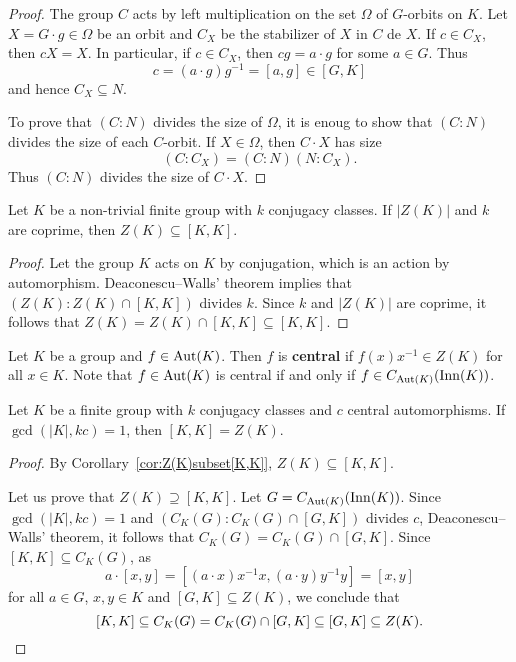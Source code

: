 \begin{proof}
  The group $C$ acts by left multiplication on the set $\Omega$ of
  $G$-orbits on $K$. Let $X=G\cdot g\in\Omega$ be an orbit and $C_X$ be the stabilizer of $X$ 
  in $C$ de $X$. If $c\in C_X$, then $cX=X$. In particular, if $c\in C_X$, then 
  $cg=a\cdot g$ for some $a\in G$. Thus 
  \[
  c=(a\cdot
  g)g^{-1}=[a,g]\in [G,K]
  \]
  and hence $C_X\subseteq N$.

  To prove that $(C:N)$ divides the size of $\Omega$, it is enoug to show that 
  $(C:N)$ divides the size of each $C$-orbit. If $X\in\Omega$, then $C\cdot
  X$ has size 
  \[
	(C:C_X)=(C:N)(N:C_X).
  \]
  Thus  $(C:N)$ divides the size of $C\cdot X$.
\end{proof}

\begin{corollary}
  \label{cor:Z(K)subset[K,K]}
  Let $K$ be a non-trivial finite group with $k$ conjugacy classes. If 
  $|Z(K)|$ and $k$ are coprime, then  
  $Z(K)\subseteq[K,K]$.
\end{corollary}

\begin{proof}
	Let the group $K$ acts on $K$ by conjugation, which is an action by automorphism. 
	Deaconescu--Walls' theorem implies that 
	$(Z(K):Z(K)\cap [K,K])$ divides $k$. Since $k$ and $|Z(K)|$ are coprime, it follows that 
	$Z(K)=Z(K)\cap [K,K]\subseteq [K,K]$. 
\end{proof}

Let $K$ be a group and $f\in\operatorname{Aut}(K)$. Then $f$ is \textbf{central} if
$f(x)x^{-1}\in Z(K)$ for all $x\in K$. Note that $f\in\operatorname{Aut}(K)$ is central
if and only if $f\in C_{\operatorname{Aut}(K)}(\mathrm{Inn}(K))$.

\begin{corollary}
	Let $K$ be a finite group with $k$ conjugacy classes and $c$ central automorphisms. 
	If $\gcd(|K|,kc)=1$, then $[K,K]=Z(K)$.
\end{corollary}

\begin{proof}
	By Corollary~\ref{cor:Z(K)subset[K,K]}, $Z(K)\subseteq [K,K]$. 
	
	Let us prove
	that $Z(K)\supseteq [K,K]$. Let 
	$G=C_{\operatorname{Aut}(K)}(\mathrm{Inn}(K))$. Since $\gcd(|K|, kc)=1$ and 
	$(C_K(G):C_K(G)\cap [G,K])$ divides $c$, 
	Deaconescu--Walls' theorem, it follows that $C_K(G)=C_K(G)\cap [G,K]$. 
	Since $[K,K]\subseteq C_K(G)$, as 
	\[
		a\cdot [x,y]=[(a\cdot x)x^{-1}x,(a\cdot y)y^{-1}y]=[x,y]
	\]
	for all $a\in G$, $x,y\in K$ and $[G,K]\subseteq Z(K)$, we conclude that 
	\[
	[K,K]\subseteq C_K(G)=C_K(G)\cap [G,K]\subseteq [G,K]\subseteq Z(K).\qedhere 
	\]
\end{proof}

